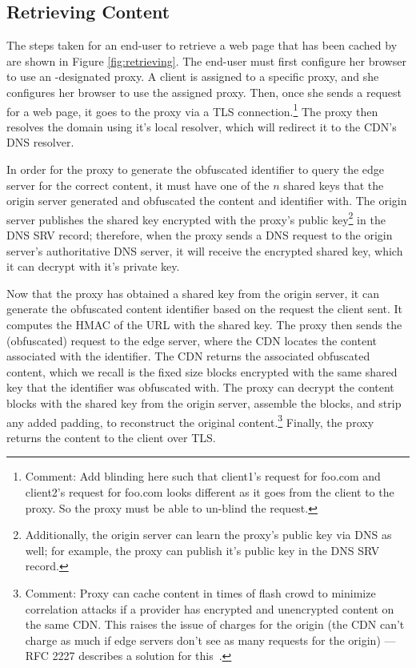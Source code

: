 \subsection{Retrieving Content}
The steps taken for an end-user to retrieve a web page that has been cached by \system{} are shown in Figure \ref{fig:retrieving}.  
The end-user must first configure her browser to use an \system{}-designated proxy.  A client is assigned to a 
specific proxy, and she configures her browser to use the assigned proxy.    Then, once she sends a request for a 
web page, it goes to the proxy via a TLS connection.\footnote{Comment: Add blinding here such that client1's request for foo.com and 
client2's request for foo.com looks different as it goes from the client to the proxy.  So the proxy must be able to un-blind 
the request.}  The proxy then resolves the domain using it's local resolver, which will 
redirect it to the CDN's DNS resolver. 

In order for the proxy to generate the obfuscated identifier to query the edge server for the correct content, 
it must have one of the $n$ shared keys that the origin server generated and obfuscated the content and identifier 
with.  The origin server publishes the shared key encrypted with the proxy's public key\footnote{Additionally, the origin server 
can learn the proxy's public key via DNS as well; for example, the proxy can publish it's public key in the DNS SRV record.} in the DNS SRV record; therefore, 
when the proxy sends a DNS request to the origin server's authoritative DNS server, it will receive the encrypted shared 
key, which it can decrypt with it's private key.  

Now that the proxy has obtained a shared key from the origin server, it can generate the obfuscated content identifier based 
on the request the client sent.  It computes the HMAC of the URL with the shared key.  The proxy then 
sends the (obfuscated) request to the edge server, where the CDN locates the content associated with the identifier.  The CDN returns 
the associated obfuscated content, which we recall is the fixed size blocks encrypted with the same shared key that the identifier was 
obfuscated with.  The proxy can decrypt the content blocks with the shared key from the origin server, assemble the blocks, and strip any 
added padding, to reconstruct the original content.\footnote{Comment: Proxy can cache content in times of flash crowd to minimize correlation attacks if a provider has encrypted and unencrypted content on the same CDN.  This raises the issue of charges for the origin (the CDN can’t charge as much if edge servers don’t see as many requests for the origin) --- RFC 2227 describes a solution for this~\cite{rfc2227}.}  Finally, the proxy returns the content to the client over TLS.  

